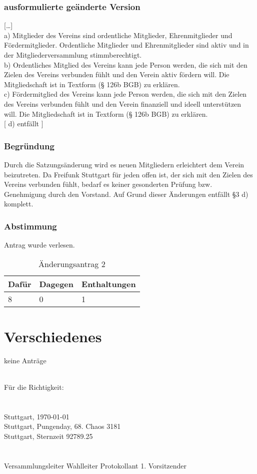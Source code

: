 \documentclass[a4paper]{scrartcl}
\begin{document}
\subsubsection{ausformulierte geänderte Version}

{[}\dots{]}\\
a) Mitglieder des Vereins sind ordentliche Mitglieder, Ehrenmitglieder und  Fördermitglieder. Ordentliche Mitglieder und Ehrenmitglieder sind  aktiv und in der Mitgliederversammlung stimmberechtigt.\\
b) Ordentliches Mitglied des Vereins kann jede Person werden, die sich mit den Zielen des Vereins verbunden fühlt und den Verein aktiv fördern  will. Die Mitgliedschaft ist in Textform (§ 126b BGB) zu erklären.\\
c) Fördermitglied des Vereins kann jede Person werden, die sich mit den Zielen des Vereins verbunden fühlt und den Verein finanziell und ideell  unterstützen will. Die Mitgliedschaft ist in Textform (§ 126b BGB) zu erklären.\\

[ d)  entfällt ]\\

\clearpage
\subsubsection{Begründung}

Durch die Satzungsänderung wird es neuen Mitgliedern erleichtert dem Verein beizutreten. Da Freifunk Stuttgart für jeden offen ist, der sich mit den Zielen des Vereins verbunden fühlt, bedarf es keiner gesonderten Prüfung bzw. Genehmigung durch den Vorstand. Auf Grund dieser Änderungen entfällt §3 d) komplett.

\subsubsection{Abstimmung}

Antrag wurde verlesen.

\begin{table}[h]
	\begin{tabularx}{\textwidth}{XXX}
		Dafür & Dagegen & Enthaltungen\\
		\toprule
		8 & 0 & 1\\
	\end{tabularx}
	\caption{Änderungsantrag 2}
\end{table}


\clearpage

\section{Verschiedenes }

keine Anträge

\vfill
\mbox{}\\
Für die Richtigkeit:\\
\\
\\
Stuttgart, \today\\
Stuttgart, Pungenday, 68. Chaos 3181\\
Stuttgart, Sternzeit 92789.25\\
\\
\\
\hfill Versammlungsleiter \hfill Wahlleiter \hfill Protokollant \hfill 1. Vorsitzender \hfill
\end{document}
